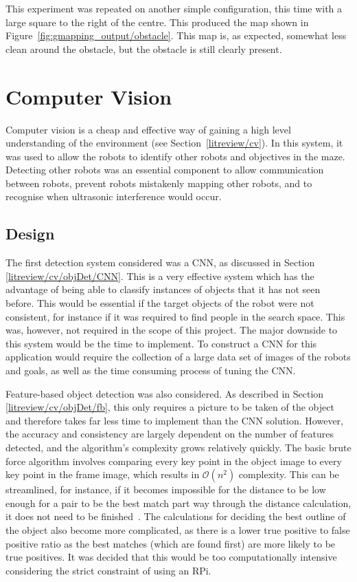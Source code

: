 This experiment was repeated on another simple configuration, this time with a
large square to the right of the centre. This produced the map shown in
Figure~\ref{fig:gmapping_output/obstacle}. This map is, as expected, somewhat less clean around the obstacle, but the obstacle is still clearly present.

\section{Computer Vision}\label{soft/cv}
Computer vision is a cheap and effective way of gaining a high level
understanding of the environment (see Section~\ref{litreview/cv}). In this system, it was used to allow the robots to
identify other robots and objectives in the maze. Detecting other
robots was an essential component to allow communication between robots,
prevent robots mistakenly mapping other robots, and to recognise when
ultrasonic interference would occur.

\subsection{Design}\label{soft/cv/design}
The first detection system considered was a CNN, as discussed in Section
\ref{litreview/cv/objDet/CNN}. This is a very effective system which has
the advantage of
being able to classify instances of objects that it has not
seen before. This would be essential if the target objects of
the robot were not consistent, for instance if it was required to find
people in the search space. This was, however, not required
in the scope of this project. The major downside to this
system would be the time to implement. To construct a CNN for
this application would require the collection of a large data
set of images of the robots and goals, as well as the time
consuming process of tuning the CNN.

Feature-based object detection was also considered. As described in
Section \ref{litreview/cv/objDet/fb}, this only requires a picture to be
taken of the object and therefore takes far less time to
implement than the CNN solution. However, the accuracy and
consistency are largely dependent on the number of features
detected, and the algorithm's complexity grows relatively
quickly. The basic brute force algorithm involves comparing
every key point in the object image to every key point in the
frame image, which results in $\mathcal{O}(n^2)$ complexity. This can be streamlined, for instance, if it becomes impossible
for the distance to be low enough for a pair to be the best
match part way through the distance calculation, it does not
need to be finished~\cite{opencv_library}. The calculations for deciding the best
outline of the object also become more complicated, as there
is a lower true positive to false positive ratio as the
best matches (which are found first) are more likely to be
true positives. It was decided that this would be too
computationally intensive considering the strict constraint of
using an RPi.

